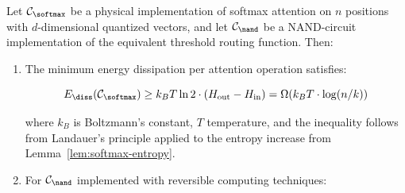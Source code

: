 \begin{theorem}






\label{thm:thermo-advantage}






Let $\mathcal{C}_{\softmax}$ be a physical implementation of softmax attention on $n$ positions with $d$-dimensional quantized vectors, and let $\mathcal{C}_{\nand}$ be a NAND-circuit implementation of the equivalent threshold routing function. Then:













\begin{enumerate}






    \item[(a)] The minimum energy dissipation per attention operation satisfies:






    \[






    E_{\diss}(\mathcal{C}_{\softmax}) \geq k_B T \ln 2 \cdot (H_{\text{out}} - H_{\text{in}}) = \Omega(k_B T \cdot \log(n/k))






    \]






    where $k_B$ is Boltzmann's constant, $T$ temperature, and the inequality follows from Landauer's principle applied to the entropy increase from Lemma~\ref{lem:softmax-entropy}.






    






    \item[(b)] For $\mathcal{C}_{\nand}$ implemented with reversible computing techniques:







\end{enumerate}
\end{theorem}
